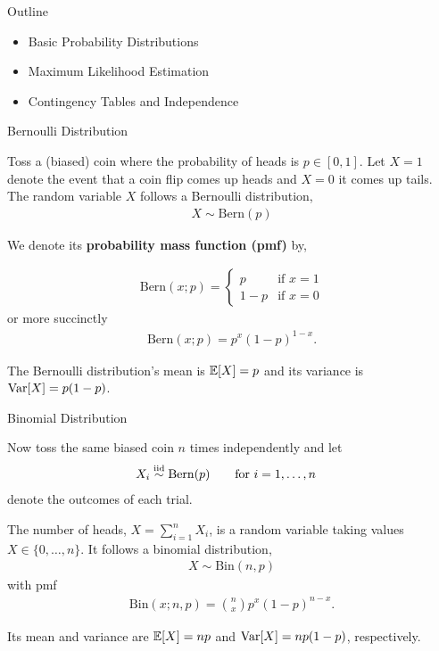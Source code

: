 \documentclass[aspectratio=169]{beamer}
\begin{document}
\begin{frame}{Outline}
  \begin{itemize}
    \item Basic Probability Distributions
    \item Maximum Likelihood Estimation
    \item Contingency Tables and Independence
  \end{itemize}
\end{frame}

\begin{frame}[t,allowframebreaks]{Bernoulli Distribution}
\label{bernoulli-distribution}

Toss a (biased) coin where the probability of heads is \(p \in [0,1]\).
Let \(X=1\) denote the event that a coin flip comes up heads and \(X=0\)
it comes up tails. The random variable \(X\) follows a Bernoulli
distribution, \begin{align*}
X \sim \mathrm{Bern}(p)
\end{align*}

We denote its \textbf{probability mass function (pmf)} by,

\begin{align*}
\mathrm{Bern}(x; p) 
=
\begin{cases}
p & \text{if } x = 1 \\
1 - p &\text{if } x = 0
\end{cases}
\end{align*} or more succinctly \begin{align*}
\mathrm{Bern}(x; p) = p^x (1-p)^{1-x}.
\end{align*}


The Bernoulli distribution's mean is \(\mathbb{E}[X] = p\) and its variance is
\(\textrm{Var}[X] = p(1-p)\).
\end{frame}

\begin{frame}[t,allowframebreaks]{Binomial Distribution}\label{binomial-distribution}

Now toss the same biased coin \(n\) times independently and let
\begin{align*}
X_i &\stackrel{\text{iid}}{\sim} \mathrm{Bern}(p) \qquad \text{for } i=1,\ldots, n
\end{align*} denote the outcomes of each trial.

The number of heads, \(X = \sum_{i=1}^n X_i\), is a random variable
taking values \(X \in \{0,\ldots,n\}\). It follows a binomial
distribution, \begin{align*}
X \sim \mathrm{Bin}(n, p)
\end{align*} with pmf \begin{align*}
\mathrm{Bin}(x; n, p) = {n \choose x} p^x (1-p)^{n-x}.
\end{align*}

Its mean and variance are \(\mathbb{E}[X] = np\) and \(\textrm{Var}[X] = np(1-p)\),
respectively.

\end{frame}
\end{document}
